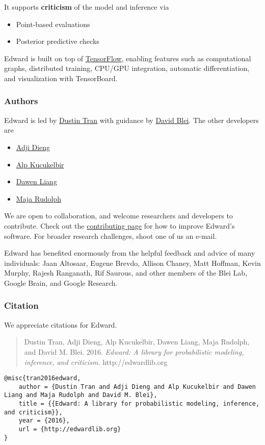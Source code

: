 It supports \textbf{criticism} of the model and inference via
\begin{itemize}
\item Point-based evaluations
\item Posterior predictive checks
\end{itemize}

Edward is built on top of
\href{https://www.tensorflow.org}{TensorFlow}, enabling features such
as computational graphs, distributed training, CPU/GPU integration,
automatic differentiation, and visualization with TensorBoard.

\subsubsection{Authors}

Edward is led by \href{http://dustintran.com}{Dustin Tran} with guidance
by \href{http://www.cs.columbia.edu/~blei/}{David Blei}. The other developers
are
\begin{itemize}
  \item \href{http://stat.columbia.edu/~diengadji/}{Adji Dieng}
  \item \href{http://www.proditus.com/}{Alp Kucukelbir}
  \item \href{http://www.ee.columbia.edu/~dliang/}{Dawen Liang}
  \item \href{http://maja-rita-rudolph.com/}{Maja Rudolph}
\end{itemize}
We are open to collaboration, and welcome
researchers and developers to contribute. Check out the
\href{contributing}{contributing page} for how to improve Edward's software.
For broader research challenges, shoot one of us an e-mail.

Edward has benefited enormously from the helpful feedback and advice
of many individuals: Jaan Altosaar, Eugene Brevdo, Allison Chaney, Matt
Hoffman, Kevin Murphy, Rajesh Ranganath, Rif Saurous, and other
members of the Blei Lab, Google Brain, and Google Research.

\subsubsection{Citation}

We appreciate citations for Edward.

\begin{quote}
Dustin Tran, Adji Dieng, Alp Kucukelbir, Dawen Liang, Maja Rudolph, and David M.
Blei. 2016.
\emph{Edward: A library for probabilistic modeling, inference, and criticism. }
http://edwardlib.org
\end{quote}

\begin{lstlisting}[class=JSON]
@misc{tran2016edward,
    author = {Dustin Tran and Adji Dieng and Alp Kucukelbir and Dawen Liang and Maja Rudolph and David M. Blei},
    title = {{Edward: A library for probabilistic modeling, inference, and criticism}},
    year = {2016},
    url = {http://edwardlib.org}
}
\end{lstlisting}
